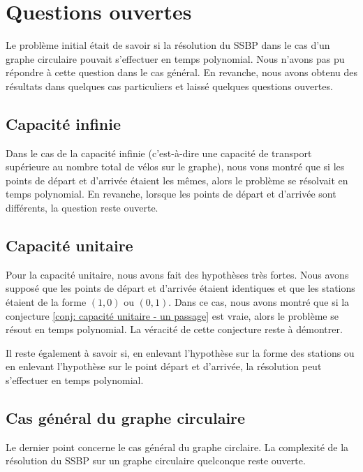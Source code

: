 \chapter{Questions ouvertes}

Le problème initial était de savoir si la résolution du SSBP dans le cas d'un graphe circulaire pouvait s'effectuer en temps polynomial. Nous n'avons pas pu répondre à cette question dans le cas général. En revanche, nous avons obtenu des résultats dans quelques cas particuliers et laissé quelques questions ouvertes.

\section{Capacité infinie}

Dans le cas de la capacité infinie (c'est-à-dire une capacité de transport supérieure au nombre total de vélos sur le graphe), nous vons montré que si les points de départ et d'arrivée étaient les mêmes, alors le problème se résolvait en temps polynomial. En revanche, lorsque les points de départ et d'arrivée sont différents, la question reste ouverte.

\section{Capacité unitaire}

Pour la capacité unitaire, nous avons fait des hypothèses très fortes. Nous avons supposé que les points de départ et d'arrivée étaient identiques et que les stations étaient de la forme $(1,0)$ ou $(0,1)$. Dans ce cas, nous avons montré que si la conjecture \ref{conj: capacité unitaire - un passage} est vraie, alors le problème se résout en temps polynomial. La véracité de cette conjecture reste à démontrer.

Il reste également à savoir si, en enlevant l'hypothèse sur la forme des stations ou en enlevant l'hypothèse sur le point départ et d'arrivée, la résolution peut s'effectuer en temps polynomial.

\section{Cas général du graphe circulaire}

Le dernier point concerne le cas général du graphe circlaire. La complexité de la résolution du SSBP sur un graphe circulaire quelconque reste ouverte.